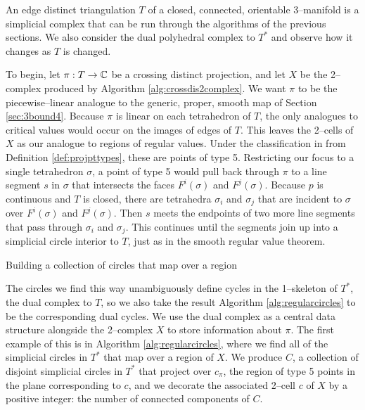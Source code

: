 An edge distinct triangulation $T$ of a closed, connected, orientable 3--manifold is a simplicial complex that can be run through the algorithms of the previous sections.
We also consider the dual polyhedral complex to $T^*$ and observe how it changes as $T$ is changed.

To begin, let $\pi:T\to\mathbb{C}$ be a crossing distinct projection, and let $X$ be the 2--complex produced by Algorithm \ref{alg:crossdis2complex}.
We want $\pi$ to be the piecewise--linear analogue to the generic, proper, smooth map of Section \ref{sec:3bound4}.
Because $\pi$ is linear on each tetrahedron of $T$, the only analogues to critical values would occur on the images of edges of $T$.
This leaves the 2--cells of $X$ as our analogue to regions of regular values.
Under the classification in from Definition \ref{def:projpttypes}, these are points of type 5.
Restricting our focus to a single tetrahedron $\sigma$, a point of type 5 would pull back through $\pi$ to a line segment $s$ in $\sigma$ that intersects the faces $F^i(\sigma)$ and $F^j(\sigma)$.
Because $p$ is continuous and $T$ is closed, there are tetrahedra $\sigma_i$ and $\sigma_j$ that are incident to $\sigma$ over $F^i(\sigma)$ and $F^j(\sigma)$.
Then $s$ meets the endpoints of two more line segments that pass through $\sigma_i$ and $\sigma_j$.
This continues until the segments join up into a simplicial circle interior to $T$, just as in the smooth regular value theorem.

\begin{algorithm}
	\caption{Building a collection of circles that map over a region}
	\label{alg:regularcircles}
\end{algorithm}

The circles we find this way unambiguously define cycles in the 1--skeleton of $T^*$, the dual complex to $T$, so we also take the result Algorithm \ref{alg:regularcircles} to be the corresponding dual cycles.
We use the dual complex as a central data structure alongside the 2--complex $X$ to store information about $\pi$.
The first example of this is in Algorithm \ref{alg:regularcircles}, where we find all of the simplicial circles in $T^*$ that map over a region of $X$.
We produce $C$, a collection of disjoint simplicial circles in $T^*$ that project over $c_\pi$, the region of type 5 points in the plane corresponding to $c$, and we decorate the associated 2--cell $c$ of $X$ by a positive integer: the number of connected components of $C$.

